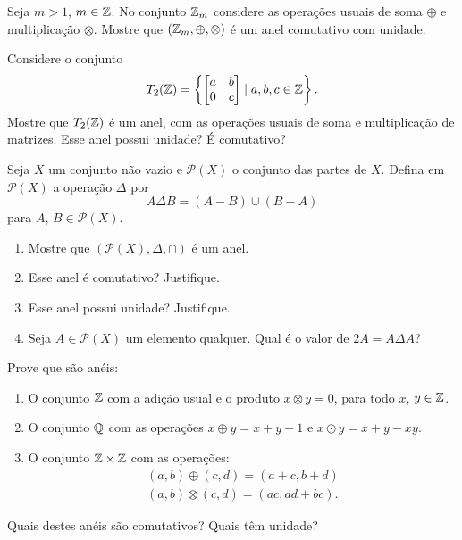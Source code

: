 \documentclass[12pt]{exam}
\begin{document}
    \vspace{.3cm}

    \questao{} Seja $m > 1$, $m \in \mathbb{Z}$. No conjunto $\mathbb{Z}_m$ considere as opera\c{c}\~oes usuais de soma $\oplus$ e multiplica\c{c}\~ao $\otimes$. Mostre que $(\mathbb{Z}_m, \oplus, \otimes)$ \'e um anel comutativo com unidade.

    \vspace{.3cm}

    \questao{} Considere o conjunto
    \[
     T_2(\mathbb{Z}) = \left\{\begin{bmatrix}a & b\\ 0 & c\end{bmatrix} \mid a, b, c \in \mathbb{Z}\right\}.
    \]
    Mostre que $T_2(\mathbb{Z})$ é um anel, com as operações usuais de soma e multiplicação de matrizes. Esse anel possui unidade? É comutativo?

    \questao{} Seja $X$ um conjunto não vazio e $\mathcal{P}(X)$ o conjunto das partes de $X$. Defina em $\mathcal{P}(X)$ a operação $\Delta$ por
    \[
        A \Delta B = (A - B) \cup (B - A)
    \]
    para $A$, $B \in \mathcal{P}(X)$.
    \begin{enumerate}[label={\alph*})]
        \item Mostre que $(\mathcal{P}(X), \Delta, \cap)$ é um anel.

        \item Esse anel é comutativo? Justifique.

        \item Esse anel possui unidade? Justifique.

        \item Seja $A \in \mathcal{P}(X)$ um elemento qualquer. Qual é o valor de $2A = A \Delta A$?
    \end{enumerate}

    \vspace{.3cm}

    \questao{} Prove que s\~ao an\'eis:
    \begin{enumerate}[label={\alph*})]
        \item O conjunto $\mathbb{Z}$ com a adi\c{c}\~ao usual e o produto $x \otimes y = 0$, para todo $x$, $y \in \mathbb{Z}$.
        \item O conjunto $\mathbb{Q}$ com as opera\c{c}\~oes $x \oplus y = x + y - 1$ e $x \odot y = x + y - xy$.
        \item O conjunto $\mathbb{Z} \times \mathbb{Z}$ com as opera\c{c}\~oes:
        \begin{align*}
            (a, b) \oplus (c, d) = (a + c, b + d)\\
            (a ,b) \otimes (c, d) = (ac, ad + bc).
        \end{align*}
    \end{enumerate}
    Quais destes an\'eis s\~ao comutativos? Quais t\^em unidade?
\end{document}
